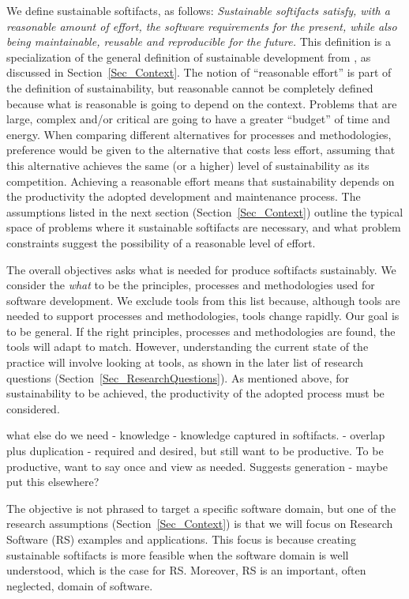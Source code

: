 \documentclass[12pt]{article}
\begin{document}
We define sustainable softifacts, as follows: \emph{Sustainable softifacts
  satisfy, with a reasonable amount of effort, the software requirements for the
  present, while also being maintainable, reusable and reproducible for the
  future.}  This definition is a specialization of the general definition of
sustainable development from \citet{Brundtland1987}, as discussed in
Section~\ref{Sec_Context}.  The notion of ``reasonable effort'' is part of the
definition of sustainability, but reasonable cannot be completely defined
because what is reasonable is going to depend on the context.  Problems that are
large, complex and/or critical are going to have a greater ``budget'' of time
and energy.  When comparing different alternatives for processes and
methodologies, preference would be given to the alternative that costs less
effort, assuming that this alternative achieves the same (or a higher) level of
sustainability as its competition.  Achieving a reasonable effort means that
sustainability depends on the productivity the adopted development and
maintenance process.  The assumptions listed in the next section
(Section~\ref{Sec_Context}) outline the typical space of problems where it
sustainable softifacts are necessary, and what problem constraints suggest the
possibility of a reasonable level of effort.

The overall objectives asks what is needed for produce softifacts sustainably.
We consider the \emph{what} to be the principles, processes and methodologies
used for software development.  We exclude tools from this list because,
although tools are needed to support processes and methodologies, tools change
rapidly.  Our goal is to be general.  If the right principles, processes and
methodologies are found, the tools will adapt to match.  However, understanding
the current state of the practice will involve looking at tools, as shown in the
later list of research questions (Section~\ref{Sec_ResearchQuestions}).  As
mentioned above, for sustainability to be achieved, the productivity of the
adopted process must be considered.

what else do we need - knowledge - knowledge captured in softifacts.  - overlap
plus duplication - required and desired, but still want to be productive.  To be
productive, want to say once and view as needed.  Suggests generation - maybe
put this elsewhere?

The objective is not phrased to target a specific software domain, but one of
the research assumptions (Section~\ref{Sec_Context}) is that we will focus on
Research Software (RS) examples and applications.  This focus is because
creating sustainable softifacts is more feasible when the software domain is
well understood, which is the case for RS.  Moreover, RS is an important,
often neglected, domain of software.
\end{document}
